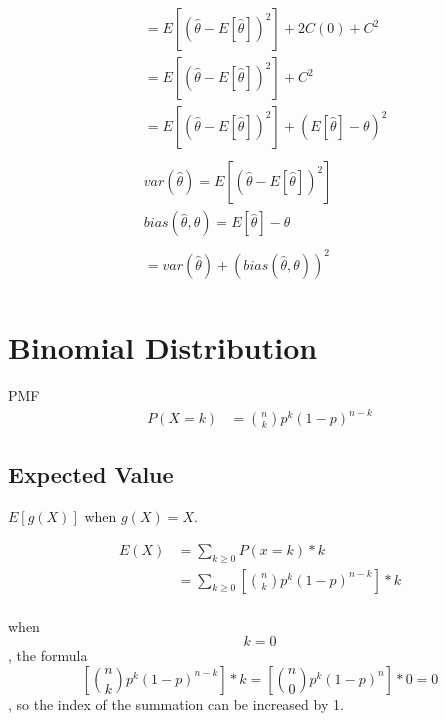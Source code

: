 \documentclass[]{article}
\begin{document}
\begin{align}
	&= E[(\hat{\theta} - E[\hat{\theta}])^2] + 2C(0) + C^2\\
	&= E[(\hat{\theta} - E[\hat{\theta}])^2] + C^2\\
	&= E[(\hat{\theta} - E[\hat{\theta}])^2] + (E[\hat{\theta}]  - \theta)^2\\	
	\\
	& var(\hat{\theta}) = E[(\hat{\theta} - E[\hat{\theta}])^2]\\
	& bias(\hat{\theta}, \theta) = E[\hat{\theta}]  - \theta\\
	\\
	&= var(\hat{\theta}) + (bias(\hat{\theta}, \theta))^2\\	
\end{align}

\section{Binomial Distribution}

PMF
\begin{align}
P(X=k) &= \binom{n} {k} p^k (1-p)^{n-k}
\end{align}


\subsection {Expected Value}

$E[g(X)]$ when $g(X) = X$.

\begin{align}
E(X) &= \sum_{k \geqslant 0}P(x=k)*k\\
&= \sum_{k \geqslant 0}[\binom{n} {k} p^k (1-p)^{n-k}] * k\\
\end{align}

when $$k=0$$, the formula $$[\binom{n} {k} p^k (1-p)^{n-k}] * k = [\binom{n} {0} p^k (1-p)^n] * 0 = 0$$, so the index of the summation can be increased by 1.
\end{document}
